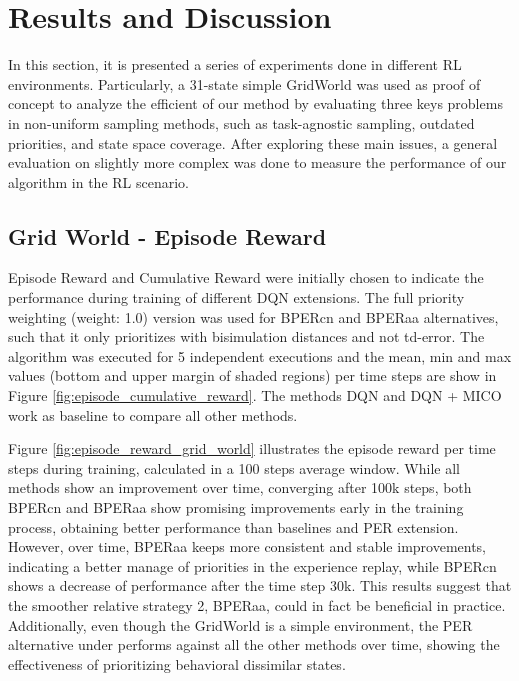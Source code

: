
\chapter{Results and Discussion}

In this section, it is presented a series of experiments done in different RL environments. Particularly, a 31-state simple GridWorld was used as proof of concept to analyze the efficient of our method by evaluating three keys problems in non-uniform sampling methods, such as task-agnostic sampling, outdated priorities, and state space coverage. After exploring these main issues, a general evaluation on slightly more complex was done to measure the performance of our algorithm in the RL scenario.

\section{Grid World - Episode Reward}

Episode Reward and Cumulative Reward were initially chosen to indicate the performance during training of different DQN extensions. The full priority weighting (weight: 1.0) version was used for BPERcn and BPERaa alternatives, such that it only prioritizes with bisimulation distances and not td-error. The algorithm was executed for 5 independent executions and the mean, min and max values (bottom and upper margin of shaded regions) per time steps are show in Figure \ref{fig:episode_cumulative_reward}. The methods DQN and DQN + MICO work as baseline to compare all other methods. 


Figure \ref{fig:episode_reward_grid_world} illustrates the episode reward per time steps during training, calculated in a 100 steps average window. While all methods show an improvement over time, converging after 100k steps, both BPERcn and BPERaa show promising improvements early in the training process, obtaining better performance than baselines and PER extension. However, over time, BPERaa keeps more consistent and stable improvements, indicating a better manage of priorities in the experience replay, while BPERcn shows a decrease of performance after the time step 30k. This results suggest that the smoother relative strategy 2, BPERaa, could in fact be beneficial in practice. Additionally, even though the GridWorld is a simple environment, the PER alternative under performs against all the other methods over time, showing the effectiveness of prioritizing behavioral dissimilar states.

